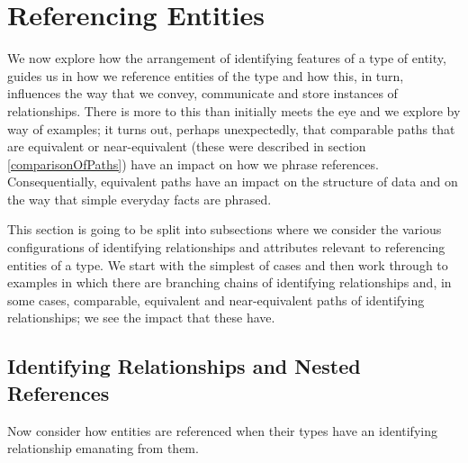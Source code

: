 \section{Referencing Entities}
\label{ReferencingEntities}

We now explore how the arrangement of identifying features of 
a type of entity, guides us in how we 
reference entities of the type and how this, in turn, influences the way that
we convey, communicate and store instances of relationships.
There is more to this than initially meets the eye
and we  explore by way of examples; 
it turns out, perhaps unexpectedly, that comparable paths that are equivalent or near-equivalent (these were described in section \ref{comparisonOfPaths}) have an impact
on how we phrase references. Consequentially, equivalent paths have an impact on the structure of data and on the way that simple everyday facts are phrased.

This section is going to be split into subsections where we consider the various configurations of identifying relationships and attributes 
relevant to referencing entities of a type. 
We start with the simplest of cases and then work through to examples in which there are branching chains of identifying relationships and, in some cases, comparable, equivalent and near-equivalent paths of identifying relationships; we see the impact that these have. 

\subsection{Identifying Relationships and Nested References}
\mynote
Now consider how entities are referenced when their types have an identifying relationship  emanating from them. 

